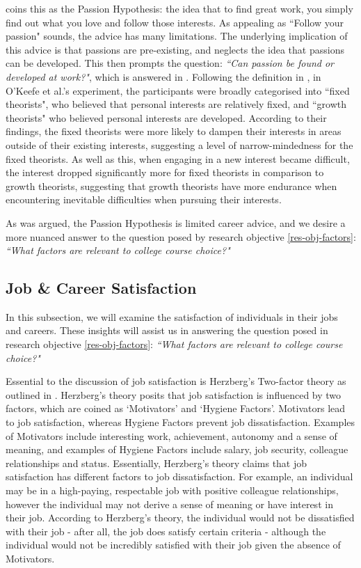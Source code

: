 \cite{newport2016so} coins this as the Passion Hypothesis: the idea that to find great work, 
you simply find out what you love and follow those interests.
As appealing as ``Follow your passion" sounds, the advice has many limitations.
The underlying implication of this advice is that passions are pre-existing,
and neglects the idea that passions can be developed.
This then prompts the question: \emph{``Can passion be found or developed at work?"},
which is answered in \cite{o2018implicit}.
Following the definition in \cite{dweck2006mindset}, 
in O'Keefe et al.'s experiment, the participants were broadly categorised into ``fixed theorists", 
who believed that personal interests are relatively fixed,
and ``growth theorists" who believed personal interests are developed.
According to their findings, the fixed theorists were more likely to dampen their interests in areas outside of their existing interests,
suggesting a level of narrow-mindedness for the fixed theorists.
As well as this, when engaging in a new interest became difficult, 
the interest dropped significantly more for fixed theorists in comparison to growth theorists,
suggesting that growth theorists have more endurance when encountering inevitable difficulties when pursuing their interests.

As was argued, the Passion Hypothesis is limited career advice, 
and we desire a more nuanced answer to the question posed by research objective \ref{res-obj-factors}:
\emph{``What factors are relevant to college course choice?"}

\subsection{Job \& Career Satisfaction}
\label{sec:job-and-career-satisfaction}

In this subsection, 
we will examine the satisfaction of individuals in their jobs and careers.
These insights will assist us in answering the question posed in research objective \ref{res-obj-factors}:
\emph{``What factors are relevant to college course choice?"}

Essential to the discussion of job satisfaction is Herzberg's Two-factor theory as outlined in \cite{herzberg1959motivation}.
Herzberg's theory posits that job satisfaction is influenced by two factors, which are coined as `Motivators' and `Hygiene Factors'.
Motivators lead to job satisfaction,
whereas Hygiene Factors prevent job dissatisfaction.
Examples of Motivators include interesting work, achievement, autonomy and a sense of meaning,
and examples of Hygiene Factors include salary, job security, colleague relationships and status.
Essentially, Herzberg's theory claims that job satisfaction has different factors to job dissatisfaction.
For example, an individual may be in a high-paying, respectable job with positive colleague relationships,
however the individual may not derive a sense of meaning or have interest in their job.
According to Herzberg's theory, the individual would not be dissatisfied with their job - after all, the job does satisfy certain criteria -
although the individual would not be incredibly satisfied with their job given the absence of Motivators.


